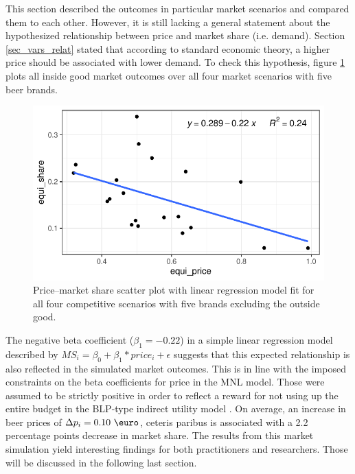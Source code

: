 \documentclass[12pt,a4paper]{article}
\begin{document}
This section described the outcomes in particular market scenarios and compared them to each other.
However, it is still lacking a general statement about the hypothesized relationship between price and market share (i.e. demand).
Section \ref{sec_vars_relat} stated that according to standard economic theory, a higher price should be associated with lower demand.
To check this hypothesis, figure \ref{fig_scatter_brand_comp} plots all inside good market outcomes over all four market scenarios with five beer brands.

\begin{figure}[ht]
	\centering
  \includegraphics[scale = 0.8]{figures/scatter_price_share_all_five_scenarios.pdf}
	\caption{Price--market share scatter plot with linear regression model fit for all four competitive scenarios with five brands excluding the outside good.}
	\label{fig_scatter_brand_comp}
\end{figure}

The negative beta coefficient ($\beta_1 = -0.22$) in a simple linear regression model described by $MS_i = \beta_0 + \beta_1 * price_i + \epsilon$ suggests that this expected relationship is also reflected in the simulated market outcomes.
This is in line with the imposed constraints on the beta coefficients for price in the MNL model.
Those were assumed to be strictly positive in order to reflect a reward for not using up the entire budget in the BLP-type indirect utility model \citep{berryAutomobilePricesMarket1995}.
On average, an increase in beer prices of $\Delta p_i = 0.10 \text{ \euro}$, ceteris paribus is associated with a 2.2 percentage points decrease in market share. The results from this market simulation yield interesting findings for both practitioners and researchers.
Those will be discussed in the following last section.
\end{document}
